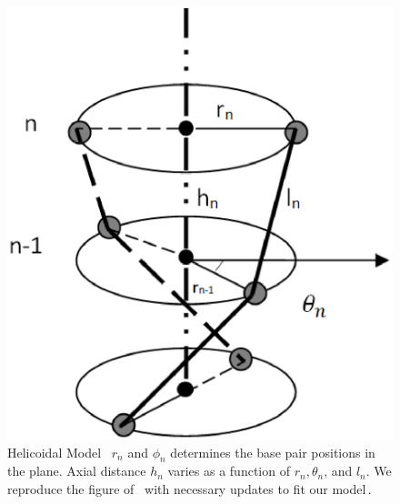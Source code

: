 \documentclass[12pt,masters,final]{UTRGVthesis}
\begin{document}
\indent
\begin{figure}[!h]
  \includegraphics[width=0.5 \textwidth]{DNA_helicoid.eps}
  \caption{\small Helicoidal Model~\protect\cite{peyrard2004nonlinear} $r_{n}$ and $\phi_{n}$ determines the base pair positions in the plane. Axial distance $h_{n}$ varies as a function of $r_{n},\theta_{n}$, and $l_{n}$. We  reproduce the figure of~\protect\cite{cocco1999statistical} with necessary updates to fit our model\,. }
  \label{fig:Helical Structure}
\end{figure}
\end{document}
